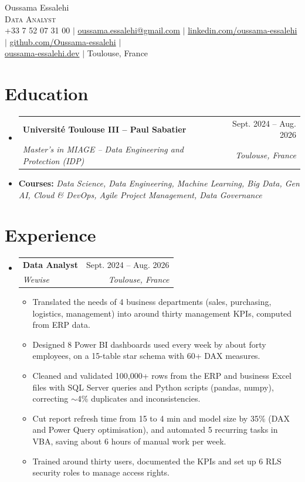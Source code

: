 \documentclass[letterpaper,10pt]{article}
\makeatletter
\newcommand{\blue}[1]{\textcolor{linkblue}{#1}}
\newcommand{\link}[2]{\href{#1}{\blue{#2}}}
\newcommand{\resumeItem}[1]{\item\small{#1 \vspace{-2pt}}}
\newcommand{\resumeSubheading}[4]{
  \vspace{-2pt}\item
    \begin{tabular*}{\textwidth}[t]{l@{\extracolsep{\fill}}r}
      \textbf{#1} & #2 \\
      \textit{#3} & \textit{#4} \\
    \end{tabular*}\vspace{-7pt}
}
\newcommand{\resumeSubHeadingListStart}{\begin{itemize}[leftmargin=0.0in, label={}]}
\newcommand{\resumeSubHeadingListEnd}{\end{itemize}}
\newcommand{\resumeItemListStart}{\begin{itemize}[leftmargin=0.15in, itemsep=0pt, topsep=2pt]}
\newcommand{\resumeItemListEnd}{\end{itemize}\vspace{-5pt}}
\makeatother
\begin{document}
\begin{center}
    {\fontsize{26}{30}\selectfont Oussama Essalehi} \\ \vspace{1pt}
    {\large\scshape\blue{Data Analyst}} \\ \vspace{3pt}
    \small +33 7 52 07 31 00 $|$
    \link{mailto:oussama.essalehi@gmail.com}{oussama.essalehi@gmail.com} $|$
    \link{https://linkedin.com/in/oussama-essalehi}{linkedin.com/oussama-essalehi} $|$
    \link{https://github.com/Oussama-essalehi}{github.com/Oussama-essalehi} $|$ \\
    \link{https://oussama-essalehi.dev}{oussama-essalehi.dev} $|$ Toulouse, France
\end{center}

\section{Education}
  \resumeSubHeadingListStart
    \resumeSubheading
      {Université Toulouse III -- Paul Sabatier}{Sept. 2024 -- Aug. 2026}
      {Master's in MIAGE -- Data Engineering and Protection (IDP)}{Toulouse, France}
      \vspace{1pt}
      \item \small \textbf{Courses:} \blue{\textit{Data Science, Data Engineering, Machine Learning, Big Data, Gen AI, Cloud \& DevOps, Agile Project Management, Data Governance}}
  \resumeSubHeadingListEnd

\section{Experience}
  \resumeSubHeadingListStart
    \resumeSubheading
      {Data Analyst}{Sept. 2024 -- Aug. 2026}
      {Wewise}{Toulouse, France}
      \resumeItemListStart
        \resumeItem{Translated the needs of 4 business departments (sales, purchasing, logistics, management) into around thirty management KPIs, computed from ERP data.}
        \resumeItem{Designed 8 Power BI dashboards used every week by about forty employees, on a 15-table star schema with 60+ DAX measures.}
        \resumeItem{Cleaned and validated 100,000+ rows from the ERP and business Excel files with SQL Server queries and Python scripts (pandas, numpy), correcting $\sim$4\% duplicates and inconsistencies.}
        \resumeItem{Cut report refresh time from 15 to 4 min and model size by 35\% (DAX and Power Query optimisation), and automated 5 recurring tasks in VBA, saving about 6 hours of manual work per week.}
        \resumeItem{Trained around thirty users, documented the KPIs and set up 6 RLS security roles to manage access rights.}
      \resumeItemListEnd
  \resumeSubHeadingListEnd
\end{document}
